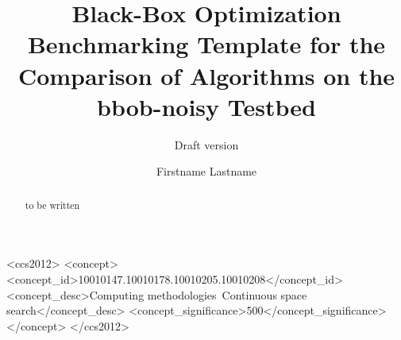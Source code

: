 \documentclass[sigconf]{acmart}
\newcommand{\bbobnoisy}{{\ttfamily bbob-noisy}\xspace}
\begin{document}
\title{Black-Box Optimization Benchmarking Template for the Comparison of Algorithms on the \bbobnoisy Testbed}
\renewcommand{\shorttitle}{Template to Compare Algorithms on the \bbobnoisy Testbed}
\subtitle{Draft version}



\author{Firstname Lastname}
%
%
%
%
%
%
%

\renewcommand{\shortauthors}{Firstname Lastname et. al.}


\begin{abstract}
to be written
\end{abstract}


%
%
 \begin{CCSXML}
<ccs2012>
<concept>
<concept_id>10010147.10010178.10010205.10010208</concept_id>
<concept_desc>Computing methodologies~Continuous space search</concept_desc>
<concept_significance>500</concept_significance>
</concept>
</ccs2012>
\end{CCSXML}
\end{document}
